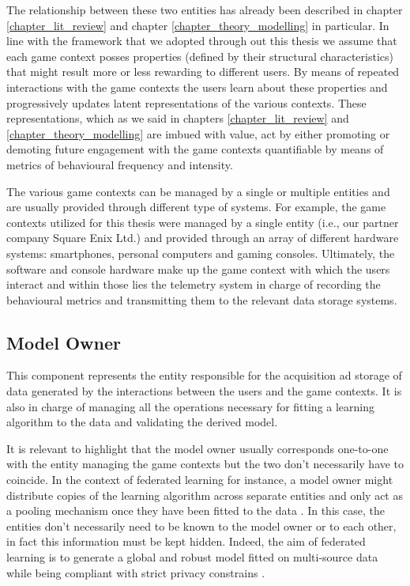 The relationship between these two entities has already been described in chapter \ref{chapter_lit_review} and chapter \ref{chapter_theory_modelling} in particular. In line with the framework that we adopted through out this thesis we assume that each game context posses properties (defined by their structural characteristics) that might result more or less rewarding to different users. By means of repeated interactions with the game contexts the users learn about these properties and progressively updates latent representations of the various contexts. These representations, which as we said in chapters \ref{chapter_lit_review} and \ref{chapter_theory_modelling} are imbued with value, act by either promoting or demoting future engagement with the game contexts quantifiable by means of metrics of behavioural frequency and intensity.

The various game contexts can be managed by a single or multiple entities and are usually provided through different type of systems. For example, the game contexts utilized for this thesis were managed by a single entity (i.e., our partner company Square Enix Ltd.) and provided through an array of different hardware systems: smartphones, personal computers and gaming consoles. Ultimately, the software and console hardware make up the game context with which the users interact and within those lies the telemetry system in charge of recording the behavioural metrics and transmitting them to the relevant data storage systems.

\subsection{Model Owner}
\label{model_owner}
This component represents the entity responsible for the acquisition ad storage of data generated by the interactions between the users and the game contexts. It is also in charge of managing all the operations necessary for fitting a learning algorithm to the data and validating the derived model. 

It is relevant to highlight that the model owner usually corresponds one-to-one with the entity managing the game contexts but the two don't necessarily  have to coincide. In the context of federated learning  \cite{yang2019federated} for instance, a model owner might distribute copies of the learning algorithm across separate entities and only act as a pooling mechanism  once they have been fitted to the data \cite{kairouz2021advances}. In this case, the entities don't necessarily need to be known to the model owner or to each other, in fact this information must be kept hidden. Indeed, the aim of federated learning is to generate a global and robust model fitted on multi-source data while being compliant with strict privacy constrains \cite{yang2019federated, kairouz2021advances}. 

